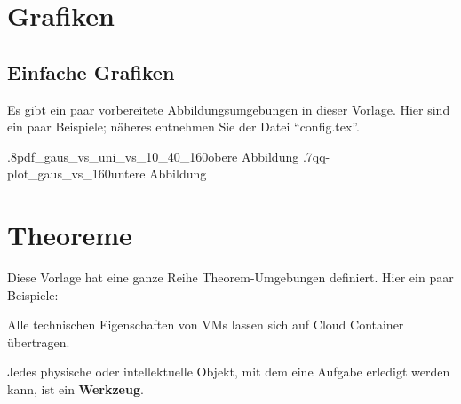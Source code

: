 \section{Grafiken}\label{sec:apdx:Figures}
\subsection{Einfache Grafiken}\label{subsec:apdx:Figures:Simple}
Es gibt ein paar vorbereitete Abbildungsumgebungen in dieser Vorlage. Hier sind ein paar Beispiele; näheres entnehmen Sie der Datei \enquote{config.tex}.


%
{.8\linewidth}{pdf_gaus_vs_uni_vs_10_40_160}{obere Abbildung}%
{.7\linewidth}{qq-plot_gaus_vs_160}{untere Abbildung}


\section{Theoreme}\label{sec:apdx:Theorem}
Diese Vorlage hat eine ganze Reihe Theorem-Umgebungen definiert. Hier ein paar Beispiele:
\begin{workingthesis}[Transitivität]\label{workingthesis:Transitivity}
	Alle technischen Eigenschaften von VMs lassen sich auf Cloud Container übertragen.
\end{workingthesis}

\begin{definition}[Werkzeug]\label{Def:GeneralTool}
	Jedes physische oder intellektuelle Objekt, mit dem eine Aufgabe erledigt werden kann, ist ein \textbf{Werkzeug}.
\end{definition}

